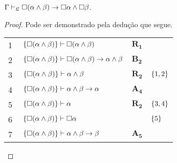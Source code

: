 \vspace{.5\baselineskip}
\begin{tcolorbox}[enhanced jigsaw, breakable, sharp corners, colframe=black, colback=white, boxrule=0.5pt, left=1.5mm, right=1.5mm, top=1.5mm, bottom=1.5mm]
    \begin{lemma}\label{necessity.conjunction.distribution}
        $\Gamma\mathrel{\vdash}_\mathfrak{L}\Box(\alpha\wedge\beta)\to\Box\alpha\wedge\Box\beta$.
        \begin{proof}
        Pode ser demonstrado pela dedução que segue.

        \vspace{0.5\baselineskip}
        \footnotesize
        \setlength{\rowskip}{0.5\baselineskip}
        \begin{xltabular}{\textwidth}{r | X l l}
            \scriptsize{\phantom{0}1}\phantom{ } & $\ \set{\nec(\alpha\wedge\beta)}\vdash\nec(\alpha\wedge\beta)$                            & $\hyperref[modal.rule.1]{\mathbf{R_1}}$        & \\[\rowskip]
            \scriptsize{\phantom{0}2}\phantom{ } & $\ \set{\nec(\alpha\wedge\beta)}\vdash\nec(\alpha\wedge\beta)\to\alpha\wedge\beta$        & $\hyperref[modal.axiom.modal.2]{\mathbf{B_2}}$ & \\[\rowskip]
            \scriptsize{\phantom{0}3}\phantom{ } & $\ \set{\nec(\alpha\wedge\beta)}\vdash\alpha\wedge\beta$                                  & $\hyperref[modal.rule.2]{\mathbf{R_2}}$        & $\left\{1,2\right\}$\\[\rowskip]
            \scriptsize{\phantom{0}4}\phantom{ } & $\ \set{\nec(\alpha\wedge\beta)}\vdash\alpha\wedge\beta\to\alpha$                         & $\hyperref[modal.axiom.4]{\mathbf{A_4}}$       & \\[\rowskip]
            \scriptsize{\phantom{0}5}\phantom{ } & $\ \set{\nec(\alpha\wedge\beta)}\vdash\alpha$                                             & $\hyperref[modal.rule.2]{\mathbf{R_2}}$        & $\left\{3,4\right\}$\\[\rowskip]
            \scriptsize{\phantom{0}6}\phantom{ } & $\ \set{\nec(\alpha\wedge\beta)}\vdash\nec\alpha$                                         & \phantom{1}           & $\left\{5\right\}$\\[\rowskip]
            \scriptsize{\phantom{0}7}\phantom{ } & $\ \set{\nec(\alpha\wedge\beta)}\vdash\alpha\wedge\beta\to\beta$                          & $\hyperref[modal.axiom.5]{\mathbf{A_5}}$       & \\[\rowskip]

\end{xltabular}
\end{proof}
\end{lemma}
\end{tcolorbox}
